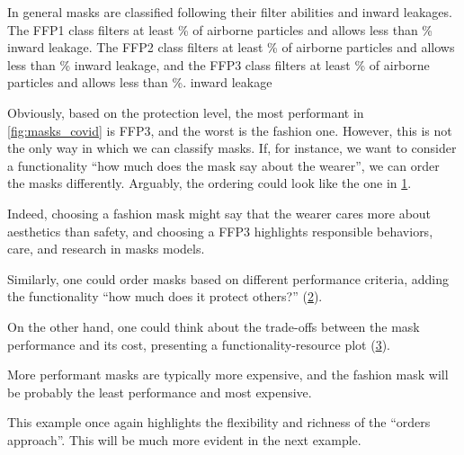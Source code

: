 In general masks are classified following their filter abilities and inward leakages. The FFP1 class filters at least \unit[80]{\%} of airborne particles and allows less than \unit[22]{\%} inward leakage.
The FFP2 class filters at least \unit[96]{\%} of airborne particles and allows less than \unit[8]{\%} inward leakage, and the FFP3 class filters at least \unit[99]{\%} of airborne particles and allows less than \unit[2]{\%}. inward leakage

Obviously, based on the protection level, the most performant in \cref{fig:masks_covid} is FFP3, and the worst is the fashion one.
However, this is not the only way in which we can classify masks. If, for instance, we want to consider a functionality ``how much does the mask say about the wearer'', we can order the masks differently.
Arguably, the ordering could look like the one in \cref{fig:masks_expressive}.

\begin{figure}[h!]
    \centering
    \caption{}
    \label{fig:masks_expressive}
\end{figure}

Indeed, choosing a fashion mask might say that the wearer cares more about aesthetics than safety, and choosing a FFP3 highlights responsible behaviors, care, and research in masks models.

Similarly, one could order masks based on different performance criteria, adding the functionality ``how much does it protect others?'' (\cref{fig:masks_others}).

\begin{figure}[h!]
    \centering
    \caption{}
    \label{fig:masks_others}
\end{figure}

On the other hand, one could think about the trade-offs between the mask performance and its cost, presenting a functionality-resource plot (\cref{fig:masks_price}).

\begin{figure}[h!]
    \centering
    \caption{}
    \label{fig:masks_price}
\end{figure}

More performant masks are typically more expensive, and the fashion mask will be probably the least performance and most expensive.

This example once again highlights the flexibility and richness of the ``orders approach''.
This will be much more evident in the next example.


